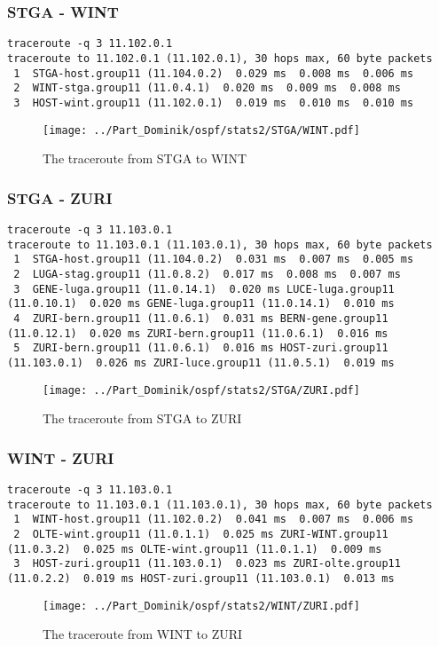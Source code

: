 \subsubsection{STGA - WINT}
\begin{lstlisting}
traceroute -q 3 11.102.0.1
traceroute to 11.102.0.1 (11.102.0.1), 30 hops max, 60 byte packets
 1  STGA-host.group11 (11.104.0.2)  0.029 ms  0.008 ms  0.006 ms
 2  WINT-stga.group11 (11.0.4.1)  0.020 ms  0.009 ms  0.008 ms
 3  HOST-wint.group11 (11.102.0.1)  0.019 ms  0.010 ms  0.010 ms
\end{lstlisting}
\begin{figure}[H]
\centering
\texttt{[image: ../Part\_Dominik/ospf/stats2/STGA/WINT.pdf]}
\caption{The traceroute from STGA to WINT}
\end{figure}
\clearpage
\subsubsection{STGA - ZURI}
\begin{lstlisting}
traceroute -q 3 11.103.0.1
traceroute to 11.103.0.1 (11.103.0.1), 30 hops max, 60 byte packets
 1  STGA-host.group11 (11.104.0.2)  0.031 ms  0.007 ms  0.005 ms
 2  LUGA-stag.group11 (11.0.8.2)  0.017 ms  0.008 ms  0.007 ms
 3  GENE-luga.group11 (11.0.14.1)  0.020 ms LUCE-luga.group11 (11.0.10.1)  0.020 ms GENE-luga.group11 (11.0.14.1)  0.010 ms
 4  ZURI-bern.group11 (11.0.6.1)  0.031 ms BERN-gene.group11 (11.0.12.1)  0.020 ms ZURI-bern.group11 (11.0.6.1)  0.016 ms
 5  ZURI-bern.group11 (11.0.6.1)  0.016 ms HOST-zuri.group11 (11.103.0.1)  0.026 ms ZURI-luce.group11 (11.0.5.1)  0.019 ms
\end{lstlisting}
\begin{figure}[H]
\centering
\texttt{[image: ../Part\_Dominik/ospf/stats2/STGA/ZURI.pdf]}
\caption{The traceroute from STGA to ZURI}
\end{figure}
\clearpage
\subsubsection{WINT - ZURI}
\begin{lstlisting}
traceroute -q 3 11.103.0.1
traceroute to 11.103.0.1 (11.103.0.1), 30 hops max, 60 byte packets
 1  WINT-host.group11 (11.102.0.2)  0.041 ms  0.007 ms  0.006 ms
 2  OLTE-wint.group11 (11.0.1.1)  0.025 ms ZURI-WINT.group11 (11.0.3.2)  0.025 ms OLTE-wint.group11 (11.0.1.1)  0.009 ms
 3  HOST-zuri.group11 (11.103.0.1)  0.023 ms ZURI-olte.group11 (11.0.2.2)  0.019 ms HOST-zuri.group11 (11.103.0.1)  0.013 ms
\end{lstlisting}
\begin{figure}[H]
\centering
\texttt{[image: ../Part\_Dominik/ospf/stats2/WINT/ZURI.pdf]}
\caption{The traceroute from WINT to ZURI}
\end{figure}
